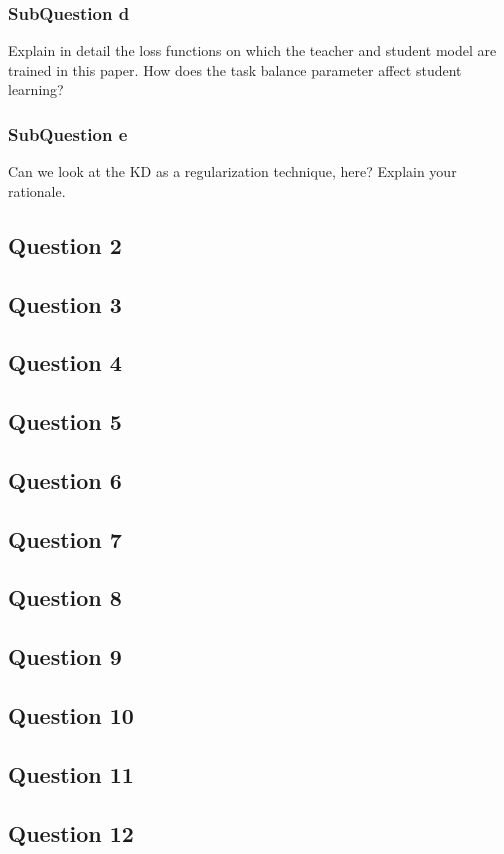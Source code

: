 \documentclass[conference]{IEEEtran}
\begin{document}
\subsubsection{SubQuestion d}
Explain in detail the loss functions on which the teacher and student model are trained in
this paper. How does the task balance parameter affect student learning? 
\subsubsection{SubQuestion e}
Can we look at the KD as a regularization technique, here? Explain your rationale.
\subsection{Question 2}
\subsection{Question 3}
\subsection{Question 4}
\subsection{Question 5}
\subsection{Question 6}
\subsection{Question 7}
\subsection{Question 8}
\subsection{Question 9}
\subsection{Question 10}
\subsection{Question 11}
\subsection{Question 12}
\end{document}
